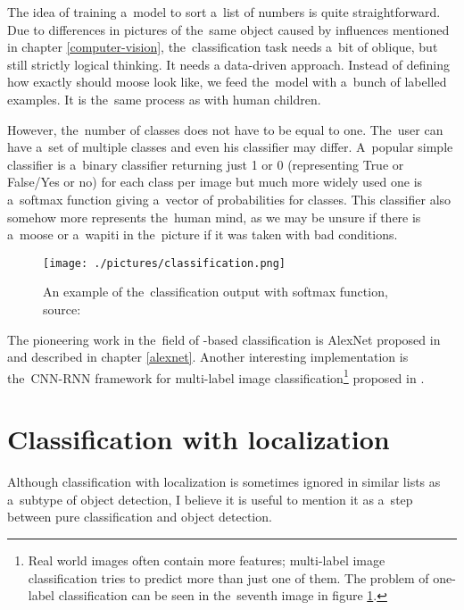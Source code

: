 The idea of training a~model to sort a~list of numbers is quite 
straightforward. Due to differences in pictures of the~same object caused by 
influences mentioned in chapter \ref{computer-vision}, the~classification task 
needs a~bit of oblique, but still strictly logical thinking. It needs a 
data-driven approach. Instead of defining how exactly should moose look like, we 
feed the~model with a~bunch of labelled examples. It is the~same process as with 
human children.

However, the~number of classes does not have to be equal to one. The~user can 
have a~set of multiple classes and even his classifier may differ. A~popular 
simple classifier is a~binary classifier returning just 1 or 0 (representing 
True or False/Yes or no) for each class per image but much more widely used one 
is a~softmax function giving a~vector of probabilities for classes. This 
classifier also somehow more represents the~human mind, as we may be unsure if 
there is a~moose or a~wapiti in the~picture if it was taken with bad 
conditions.

\begin{figure}[H]
   \centering
	\texttt{[image: ./pictures/classification.png]}
	\caption[Classification example]{An example of the~classification output with 
	softmax function, source: \cite{cnn-classification}}
      \label{fig:class}
\end{figure}

The pioneering work in the~field of -based classification is AlexNet 
proposed in \cite{cnn-classification} and described in chapter \ref{alexnet}. 
Another interesting implementation is the~CNN-RNN framework for multi-label 
image classification\footnote{Real world images often contain more features; 
multi-label image classification tries to predict more than just one of them. 
The problem of one-label classification can be seen in the~seventh image in 
figure \ref{fig:class}.} proposed in \cite{multi-classification}.

\section{Classification with localization}
\label{classification-localization}

Although classification with localization is sometimes ignored in similar lists 
as a~subtype of object detection, I believe it is useful to mention it as a~step 
between pure classification and object detection.

